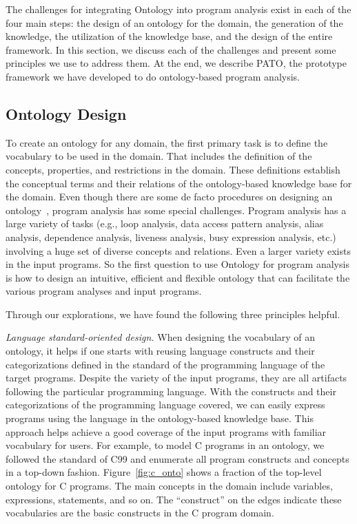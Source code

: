 The challenges for integrating Ontology into program analysis exist in
each of the four main steps: the design of an ontology for the domain,
the generation of the knowledge, the utilization of the knowledge
base, and the design of the entire framework.  In this section, we
discuss each of the challenges and present some principles we use to
address them. At the end, we describe PATO, 
the prototype framework we have developed to do ontology-based program
analysis.  %

\subsection{Ontology Design}

\vspace*{.1in} To create an ontology for any
domain, the first primary task is to define the vocabulary to be used
in the domain. That includes the definition of the concepts,
properties, and restrictions in the domain.
These definitions establish the conceptual
terms and their relations of the ontology-based knowledge base for the domain.
Even though there are some de facto procedures on
designing an ontology~\cite{noy2001ontology}, program analysis has
some special challenges. %
Program analysis has a large variety of tasks (e.g., loop analysis,
data access pattern analysis, alias analysis, dependence analysis,
liveness analysis, busy expression analysis, etc.) involving a huge
set of diverse concepts and relations.  Even a larger variety exists
in the input programs.  So the first question to use Ontology for
program analysis is how to design an intuitive, efficient and flexible
ontology that can facilitate the various program analyses and input
programs.

\vspace*{.1in} 
Through our explorations, we have found the following three principles
helpful.

{\em Language standard-oriented design.}  When designing the
vocabulary of an ontology, it helps if one starts with reusing
language constructs and their categorizations defined in the standard
of the programming language of the target programs. Despite the
variety of the input programs, they are all artifacts following the
particular programming language. With the constructs and their
categorizations of the programming language covered, we can easily
express programs using the language in the ontology-based knowledge
base. This approach helps achieve a good coverage of the input
programs with familiar vocabulary for users.  For example, to model C
programs in an ontology, we followed the standard of C99 and enumerate
all program constructs and concepts in a top-down
fashion. Figure~\ref{fig:c_onto} shows a fraction of the top-level
ontology for C programs.  The main concepts in the domain include
variables, expressions, statements, and so on. The ``construct'' on the
edges indicate these vocabularies are the basic constructs in the C program domain.

